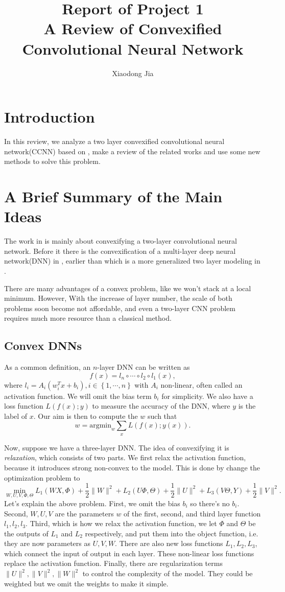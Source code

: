 \documentclass{article}
\title{Report of Project 1\\A Review of Convexified Convolutional Neural Network}
\author{Xiaodong Jia}
\begin{document}
\maketitle

\tableofcontents
\newpage

\section{Introduction}
In this review, we analyze a two layer convexified convolutional neural network(CCNN) based on \cite{zhang2016convexified}, make a review of the related works and use some new methods to solve this problem.
\section{A Brief Summary of the Main Ideas}
The work in \cite{zhang2016convexified} is mainly about convexifying a two-layer convolutional neural network. Before it there is the convexification of a multi-layer deep neural network(DNN) in \cite{aslan2014convex}, earlier than which is a more generalized two layer modeling in \cite{aslan2013convex}.

There are many advantages of a convex problem, like we won't stack at a local minimum. However, With the increase of layer number, the scale of both problems soon become not affordable, and even a two-layer CNN problem requires much more resource than a classical method.
\subsection{Convex DNNs}
As a common definition, an $n$-layer DNN can be written as \[f(x)=l_n\circ\cdots\circ l_2\circ l_1(x),\] where $l_i=A_i(w_i^Tx+b_i),i\in\left\lbrace 1,\cdots,n\right\rbrace $ with $A_i$ non-linear, often called an activation function. We will omit the bias term $b_i$ for simplicity. We also have a loss function $L(f(x);y)$ to measure the accuracy of the DNN, where $y$ is the label of $x$. Our aim is then to compute the $w$ such that
\[w=\text{argmin}_{w}\sum_{x}L(f(x);y(x)).\]

Now, suppose we have a three-layer DNN. The idea of convexifying it is \emph{relaxation}, which consists of two parts. We first relax the activation function, because it introduces strong non-convex to the model. This is done by change the optimization problem to
\[\min_{W,U,V,\Phi,\Theta}L_1(WX,\Phi)+\frac{1}{2}\|W\|^2+L_2(U\Phi,\Theta)+\frac{1}{2}\|U\|^2+L_3(V\Theta,Y)+\frac{1}{2}\|V\|^2.\]
Let's explain the above problem. First, we omit the bias $b_i$ so there's no $b_i$. Second, $W,U,V$ are the parameters $w$ of the first, second, and third layer function $l_1,l_2,l_3$. Third, which is how we relax the activation function, we let $\Phi$ and $\Theta$ be the outputs of $L_1$ and $L_2$ respectively, and put them into the object function, i.e. they are now parameters as $U,V,W$. There are also new loss functions $L_1,L_2,L_3$, which connect the input of output in each layer. These non-linear loss functions replace the activation function. Finally, there are regularization terms $\|U\|^2,\|V\|^2,\|W\|^2$ to control the complexity of the model. They could be weighted but we omit the weights to make it simple.
\end{document}
